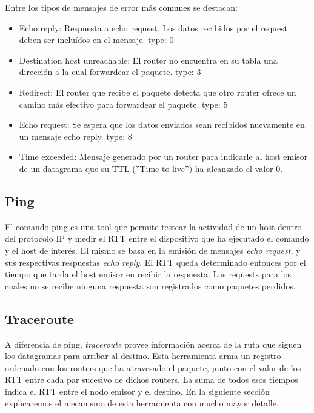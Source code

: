 Entre los tipos de mensajes de error m\'as comunes se destacan:
\begin{itemize}
  \item Echo reply: Respuesta a echo request. Los datos recibidos por el request deben ser inclu\'idos
  en el mensaje. type: 0
  \item Destination host unreachable: El router no encuentra en su tabla una direcci\'on a la cual
  forwardear el paquete. type: 3
  \item Redirect: El router que recibe el paquete detecta que otro router ofrece un camino m\'as
  efectivo para forwardear el paquete. type: 5
  \item Echo request: Se espera que los datos enviados sean recibidos nuevamente en un mensaje echo
  reply. type: 8
  \item Time exceeded: Mensaje generado por un router para indicarle al host emisor de un datagrama
  que su TTL (''Time to live'') ha alcanzado el valor 0.

\end{itemize}


\subsection{Ping}

El comando ping es una tool que permite testear la actividad de un host dentro del protocolo IP y medir
el RTT entre el dispositivo que ha ejecutado el comando y el host de inter\'es. El mismo se basa en
la emisi\'on de mensajes \emph{echo request}, y sus respectivas respuestas \emph{echo reply}. El RTT queda
determinado entonces por el tiempo que tarda el host emisor en recibir la respuesta.
Los requests para los cuales no se recibe ninguna respuesta son registrados como paquetes perdidos.

\subsection{Traceroute}

A diferencia de ping, \emph{traceroute} provee informaci\'on acerca de la ruta que siguen los datagramas
para arribar al destino. Esta herramienta arma un registro ordenado con los routers que ha atravesado
el paquete, junto con el valor de los RTT entre cada par sucesivo de dichos routers. La suma de todos
esos tiempos indica el RTT entre el nodo emisor y el destino. En la siguiente secci\'on explicaremos el
mecanismo de esta herramienta con mucho mayor detalle.
